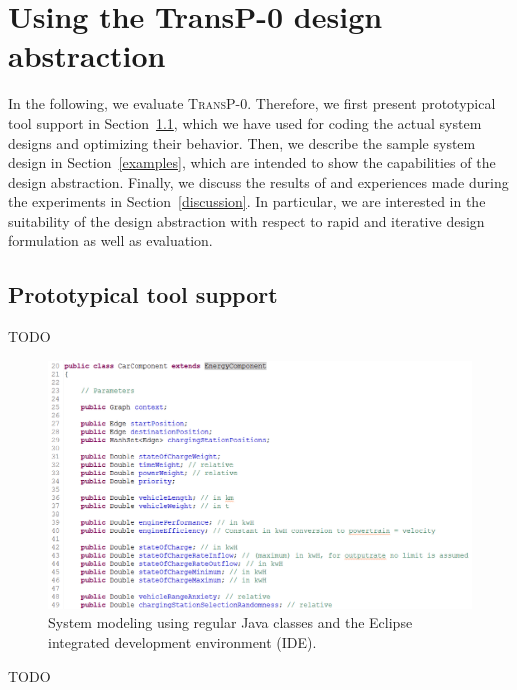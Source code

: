 \section{Using the \textbf{TransP-0} design abstraction}
\label{demonstration}

In the following, we evaluate \textsc{TransP-0}. Therefore, we first present prototypical tool support in Section~\ref{tool}, which we have used for coding the actual system designs and optimizing their behavior. Then, we describe the sample system design in Section~\ref{examples}, which are intended to show the capabilities of the design abstraction. Finally, we discuss the results of and experiences made during the experiments in Section~\ref{discussion}. In particular, we are interested in the suitability of the design abstraction with respect to rapid and iterative design formulation as well as evaluation.

\subsection{Prototypical tool support}
\label{tool}

TODO

\begin{figure}[h]
	\includegraphics[width=\columnwidth]{./gfx/modeling.png}
	\caption{System modeling using regular Java classes and the Eclipse integrated development environment (IDE).}
	\label{figure:modeling}
\end{figure}

TODO

